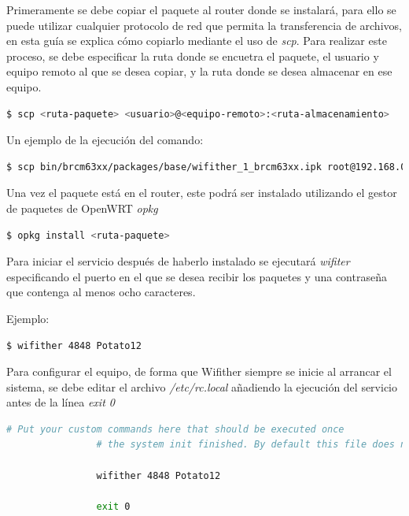 \documentclass[12pt]{article}
\begin{document}
            Primeramente se debe copiar el paquete al router donde se instalará, para ello se puede utilizar cualquier protocolo de red que permita la transferencia de archivos, en esta guía se explica cómo copiarlo mediante el uso de \textit{scp}. Para realizar este proceso, se debe especificar la ruta donde se encuetra el paquete, el usuario y equipo remoto al que se desea copiar, y la ruta donde se desea almacenar en ese equipo.

            \begin{lstlisting}[language=bash]
                $ scp <ruta-paquete> <usuario>@<equipo-remoto>:<ruta-almacenamiento>
            \end{lstlisting}

            Un ejemplo de la ejecución del comando:
            \begin{lstlisting}[language=bash]
                $ scp bin/brcm63xx/packages/base/wifither_1_brcm63xx.ipk root@192.168.0.4:/root/wifither
            \end{lstlisting}

            Una vez el paquete está en el router, este podrá ser instalado utilizando el gestor de paquetes de OpenWRT \textit{opkg}
            \begin{lstlisting}[language=bash]
                $ opkg install <ruta-paquete>
            \end{lstlisting}

            Para iniciar el servicio después de haberlo instalado se ejecutará \textit{wifiter} especificando el puerto en el que se desea recibir los paquetes y una contraseña que contenga al menos ocho caracteres.

            Ejemplo:
            \begin{lstlisting}[language=bash]
                $ wifither 4848 Potato12
            \end{lstlisting}

            Para configurar el equipo, de forma que Wifither siempre se inicie al arrancar el sistema, se debe editar el archivo \textit{/etc/rc.local} añadiendo la ejecución del servicio antes de la línea \textit{exit 0}

            \begin{lstlisting}[language=bash]
                # Put your custom commands here that should be executed once
                # the system init finished. By default this file does nothing.

                wifither 4848 Potato12

                exit 0
            \end{lstlisting}
\end{document}
